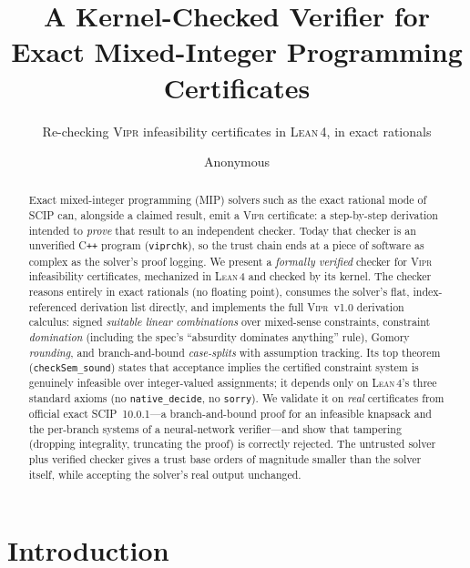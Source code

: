 \documentclass[runningheads]{llncs}
\newcommand{\code}[1]{\texttt{#1}}
\newcommand{\scip}{\textsc{SCIP}}
\newcommand{\vipr}{\textsc{Vipr}}
\newcommand{\lean}{\textsc{Lean\,4}}
\begin{document}
\title{A Kernel-Checked Verifier for Exact Mixed-Integer Programming Certificates}
\subtitle{Re-checking \vipr{} infeasibility certificates in \lean{}, in exact rationals}

\author{Anonymous}

\maketitle

\begin{abstract}
Exact mixed-integer programming (MIP) solvers such as the exact rational mode of
\scip{} can, alongside a claimed result, emit a \vipr{} certificate: a step-by-step
derivation intended to \emph{prove} that result to an independent checker. Today that
checker is an unverified C\texttt{++} program (\code{viprchk}), so the trust chain ends
at a piece of software as complex as the solver's proof logging. We present a
\emph{formally verified} checker for \vipr{} infeasibility certificates, mechanized in
\lean{} and checked by its kernel. The checker reasons entirely in exact rationals (no
floating point), consumes the solver's flat, index-referenced derivation list directly,
and implements the full \vipr~v1.0 derivation calculus: signed \emph{suitable linear
combinations} over mixed-sense constraints, constraint \emph{domination} (including the
spec's ``absurdity dominates anything'' rule), Gomory \emph{rounding}, and
branch-and-bound \emph{case-splits} with assumption tracking. Its top theorem
(\code{checkSem\_sound}) states that acceptance implies the certified constraint system
is genuinely infeasible over integer-valued assignments; it depends only on \lean{}'s
three standard axioms (no \code{native\_decide}, no \code{sorry}). We validate it on
\emph{real} certificates from official exact \scip~10.0.1---a branch-and-bound proof for
an infeasible knapsack and the per-branch systems of a neural-network verifier---and show
that tampering (dropping integrality, truncating the proof) is correctly rejected. The
untrusted solver plus verified checker gives a trust base orders of magnitude smaller
than the solver itself, while accepting the solver's real output unchanged.
\end{abstract}

\section{Introduction}\label{sec:intro}
\end{document}
